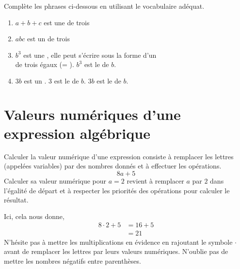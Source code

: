\documentclass[../../syllabus_1.tex]{subfiles}
\begin{document}
\begin{exercise}
    Complète les phrases ci-dessous en utilisant le vocabulaire adéquat. %
    \begin{enumerate}[itemsep=.5cm]
        \item \(a + b + c\) est une \dotfill de trois \dotfill
        \item \(abc\) est un \dotfill de trois \dotfill
        \item \(b^{3}\) est une \dotfill, elle peut s'écrire sous la forme d'un \dotfill \\ de trois \dotfill égaux (= \dotfill). \(b^3\) est le \dotfill de \(b\).
        \item \(3b\) est un \dotfill. \(3\) est le \dotfill de \(b\). \(3b\) est le \dotfill de \(b\).
    \end{enumerate}
    \vspace{.5cm}
\end{exercise}

\newpage
\section{Valeurs numériques d'une expression algébrique}

Calculer la valeur numérique d'une expression consiste à remplacer les lettres (appelées variables) par des nombres donnés et à effectuer les opérations.
\begin{equation*}
    8a+5
\end{equation*}
Calculer sa valeur numérique pour \(a = 2\) revient à remplacer \(a\) par \(2\) dans l'égalité de départ et à respecter les priorités des opérations pour calculer le résultat.

Ici, cela nous donne,
\begin{align*}
    8 \cdot 2 + 5 & = 16 + 5 \\
                  & = 21
\end{align*}
N'hésite pas à mettre les multiplications en évidence en rajoutant le symbole \(\cdot \) avant de remplacer les lettres par leurs valeurs numériques.
N'oublie pas de mettre les nombres négatifs entre parenthèses.
\end{document}
